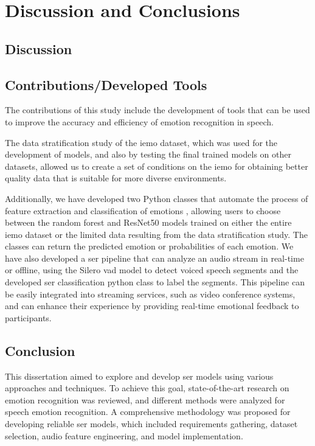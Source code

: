 \chapter{Discussion and Conclusions}
\label{chapter:conc}

\section{Discussion}


\section{Contributions/Developed Tools}

The contributions of this study include the development of tools that can be used to improve the accuracy and efficiency of emotion recognition in speech.

The data stratification study of the \ac{iemo} dataset, which was used for the development of models, and also by testing the final trained models on other datasets, allowed us to create a set of conditions on the \ac{iemo} for obtaining better quality data that is suitable for more diverse environments.

Additionally, we have developed two Python classes that automate the process of feature extraction and classification of emotions \cite{Mario_Silva_Speech_Emotion_Recognition_2023}, allowing users to choose between the random forest and ResNet50 models trained on either the entire \ac{iemo} dataset or the limited data resulting from the data stratification study. The classes can return the predicted emotion or probabilities of each emotion. We have also developed a \ac{ser} pipeline that can analyze an audio stream in real-time or offline, using the Silero \ac{vad} model to detect voiced speech segments and the developed \ac{ser} classification python class to label the segments. This pipeline can be easily integrated into streaming services, such as video conference systems, and can enhance their experience by providing real-time emotional feedback to participants.

\section{Conclusion}

This dissertation aimed to explore and develop \ac{ser} models using various approaches and techniques. To achieve this goal, state-of-the-art research on emotion recognition was reviewed, and different methods were analyzed for speech emotion recognition. A comprehensive methodology was proposed for developing reliable \ac{ser} models, which included requirements gathering, dataset selection, audio feature engineering, and model implementation.

